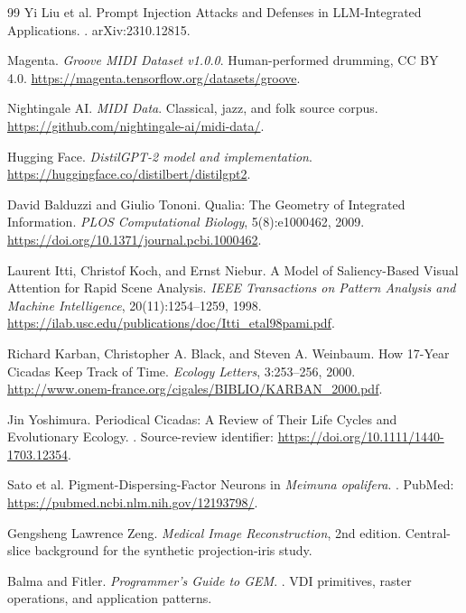 \begin{thebibliography}{99}
Yi Liu et al.
\newblock Prompt Injection Attacks and Defenses in LLM-Integrated Applications.
. arXiv:2310.12815.

Magenta.
\newblock \emph{Groove MIDI Dataset v1.0.0}.
\newblock Human-performed drumming, CC BY 4.0.
\newblock \url{https://magenta.tensorflow.org/datasets/groove}.

Nightingale AI.
\newblock \emph{MIDI Data}.
\newblock Classical, jazz, and folk source corpus.
\newblock \url{https://github.com/nightingale-ai/midi-data/}.

Hugging Face.
\newblock \emph{DistilGPT-2 model and implementation}.
\newblock \url{https://huggingface.co/distilbert/distilgpt2}.

David Balduzzi and Giulio Tononi.
\newblock Qualia: The Geometry of Integrated Information.
\newblock \emph{PLOS Computational Biology}, 5(8):e1000462, 2009.
\newblock \url{https://doi.org/10.1371/journal.pcbi.1000462}.

Laurent Itti, Christof Koch, and Ernst Niebur.
\newblock A Model of Saliency-Based Visual Attention for Rapid Scene Analysis.
\newblock \emph{IEEE Transactions on Pattern Analysis and Machine Intelligence}, 20(11):1254--1259, 1998.
\newblock \url{https://ilab.usc.edu/publications/doc/Itti_etal98pami.pdf}.

Richard Karban, Christopher A. Black, and Steven A. Weinbaum.
\newblock How 17-Year Cicadas Keep Track of Time.
\newblock \emph{Ecology Letters}, 3:253--256, 2000.
\newblock \url{http://www.onem-france.org/cigales/BIBLIO/KARBAN_2000.pdf}.

Jin Yoshimura.
\newblock Periodical Cicadas: A Review of Their Life Cycles and Evolutionary Ecology.
. Source-review identifier: \url{https://doi.org/10.1111/1440-1703.12354}.

Sato et al.
\newblock Pigment-Dispersing-Factor Neurons in \emph{Meimuna opalifera}.
. PubMed: \url{https://pubmed.ncbi.nlm.nih.gov/12193798/}.

Gengsheng Lawrence Zeng.
\newblock \emph{Medical Image Reconstruction}, 2nd edition.
\newblock Central-slice background for the synthetic projection-iris study.

Balma and Fitler.
\newblock \emph{Programmer's Guide to GEM}.
. VDI primitives, raster operations, and application patterns.


\end{thebibliography}
